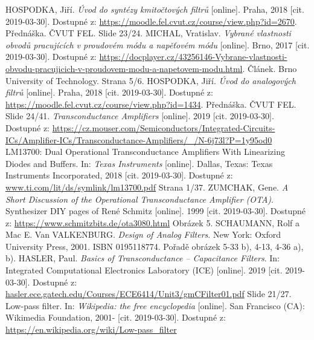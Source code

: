\documentclass[twoside]{article}
\begin{document}
\begin{thebibliography}{999}
HOSPODKA, Jiří. \textit{Úvod do syntézy kmitočtových filtrů} [online]. Praha, 2018 [cit. 2019-03-30]. Dostupné z: \url{https://moodle.fel.cvut.cz/course/view.php?id=2670}. Přednáška. ČVUT FEL. Slide 23/24.
MICHAL, Vratislav. \textit{Vybrané vlastnosti obvodů pracujících v proudovém módu a napěťovém módu} [online]. Brno, 2017 [cit. 2019-03-30]. Dostupné z: \url{https://docplayer.cz/43256146-Vybrane-vlastnosti-obvodu-pracujicich-v-proudovem-modu-a-napetovem-modu.html}. Článek. Brno University of Technology. Strana 5/6.
HOSPODKA, Jiří. \textit{Úvod do analogových filtrů} [online]. Praha, 2018 [cit. 2019-03-30]. Dostupné z: \url{https://moodle.fel.cvut.cz/course/view.php?id=1434}. Přednáška. ČVUT FEL. Slide 24/41.
\textit{Transconductance Amplifiers} [online]. 2019 [cit. 2019-03-30]. Dostupné z: \url{https://cz.mouser.com/Semiconductors/Integrated-Circuits-ICs/Amplifier-ICs/Transconductance-Amplifiers/_/N-6j73l?P=1y95od0}
LM13700: Dual Operational Transconductance Amplifiers With Linearizing Diodes and Buffers. In: \textit{Texas Instruments} [online]. Dallas, Texas: Texas Instruments Incorporated, 2018 [cit. 2019-03-30]. Dostupné z: \url{www.ti.com/lit/ds/symlink/lm13700.pdf} Strana 1/37.
ZUMCHAK, Gene.  \textit{A Short Discussion of the Operational Transconductance Amplifier (OTA)}. Synthesizer DIY pages of René Schmitz [online]. 1999 [cit. 2019-03-30]. Dostupné z: \url{https://www.schmitzbits.de/ota3080.html} Obrázek 5.
SCHAUMANN, Rolf a Mac E. Van VALKENBURG. \textit{Design of Analog Filters}. New York: Oxford University Press, 2001. ISBN 0195118774. Pořadě obrázek 5-33 b), 4-13, 4-36 a), b).
HASLER, Paul. \textit{Basics of Transconductance – Capacitance Filters}. In: Integrated Computational Electronics Laboratory (ICE) [online]. 2019 [cit. 2019-03-30]. Dostupné z: \url{hasler.ece.gatech.edu/Courses/ECE6414/Unit3/gmCFilter01.pdf} Slide 21/27.
Low-pass filter. In: \textit{Wikipedia: the free encyclopedia} [online]. San Francisco (CA): Wikimedia Foundation, 2001- [cit. 2019-03-30]. Dostupné z: \url{https://en.wikipedia.org/wiki/Low-pass_filter}
\end{thebibliography}
\end{document}

